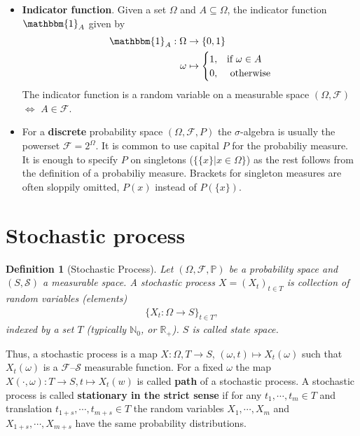 \documentclass[10pt,a4paper]{article}
\newtheorem{definition}{Definition}
\begin{document}
\begin{itemize}
	\item \textbf{Indicator function}. Given a set $\Omega$ and $A \subseteq \Omega$, the indicator function $\mathbbm{1}_A$ given by
	\begin{align*}
		\mathbbm{1}_A : \Omega &\rightarrow \{0,1\}   \\
		\omega &\mapsto \begin{cases}
			1, & \text{if } \omega \in A \\
			0, & \text{ otherwise} 
		\end{cases}
	\end{align*}
	The indicator function is a random variable on a measurable space $(\Omega, \mathcal F)$ $\Leftrightarrow$ $A \in \mathcal F$.
	\item For a \textbf{discrete} probability space $(\Omega, \mathcal F, P)$ the $\sigma$-algebra is usually the powerset $\mathcal F = 2^\Omega$. It is common to use capital $P$ for the probabiliy measure.    It is enough to specify $P$ on singletons ($\{\{ x\} | x \in \Omega \}$) as the rest follows from the definition of a probabiliy measure.  Brackets for singleton measures are often sloppily omitted, $P(x)$ instead of $P(\{x\})$. 
\end{itemize}



\section{Stochastic process}
		
	
	
	\begin{definition}[Stochastic Process]
		Let $(\Omega, \mathcal{F}, \mathbb{P})$ be a probability space and $(S, \mathcal{S})$ a measurable space.  
		A \emph{stochastic process}  $X=(X_t)_{t \in T} $ is collection of random variables (elements)
		\begin{align*}
		\{ X_t : \Omega \to S \}_{t \in T},
		\end{align*}
		indexed by a set $T$ (typically $\mathbb N_0$, or $\mathbb R _{+}$). $S$ is called state space.
	\end{definition}

\noindent	
Thus, a stochastic process is a map $X: \Omega, T \rightarrow S$, $(\omega, t) \mapsto X_t(\omega)$ such that $X_t(\omega)$ is a $\mathcal F$--$\mathcal S$  measurable function. For a fixed $\omega$ the map $X(\cdot, \omega): T \rightarrow S, t\mapsto X_t(w)$ is called \textbf{path} of a stochastic process.  A stochastic process is called  \textbf{stationary in the strict sense} if for any $t_1, \cdots, t_m \in T$ and translation 
	$ t_{1+s}, \cdots, t_{m+s}\in T$ the random variables   $X_1, \cdots, X_m $ and
$X_{1+s}, \cdots, X_{m+s}$	have the same probability distributions.
	
\end{document}
